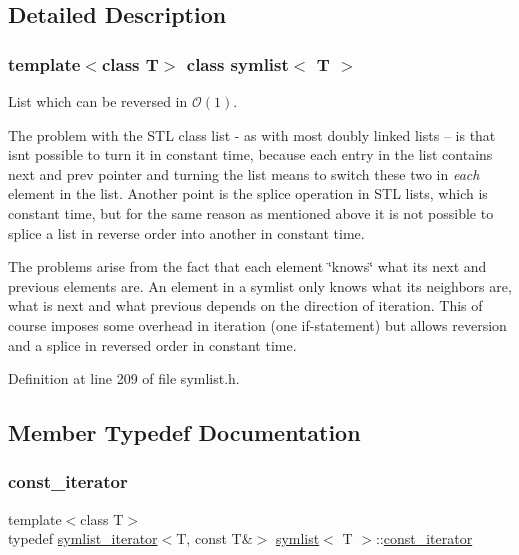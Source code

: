 \subsection{Detailed Description}
\subsubsection*{template$<$class T$>$\newline
class symlist$<$ T $>$}

List which can be reversed in $\mathcal{O}(1)$. 

The problem with the S\+TL class list -\/ as with most doubly linked lists -- is that isn\textquotesingle{}t possible to turn it in constant time, because each entry in the list contains next and prev pointer and turning the list means to switch these two in {\itshape each} element in the list. Another point is the splice operation in S\+TL lists, which is constant time, but for the same reason as mentioned above it is not possible to splice a list in reverse order into another in constant time. 

The problems arise from the fact that each element \char`\"{}knows\char`\"{} what its next and previous elements are. An element in a symlist only knows what its neighbors are, what is next and what previous depends on the direction of iteration. This of course imposes some overhead in iteration (one if-\/statement) but allows reversion and a splice in reversed order in constant time. 

Definition at line 209 of file symlist.\+h.



\subsection{Member Typedef Documentation}
\mbox{\label{classsymlist_af15c0ca931299054f83d17a1580a5159}} 
\subsubsection{\texorpdfstring{const\+\_\+iterator}{const\_iterator}}
{\footnotesize\ttfamily template$<$class T$>$ \\
typedef \mbox{\hyperlink{structsymlist__iterator}{symlist\+\_\+iterator}}$<$T, const T\&$>$ \mbox{\hyperlink{classsymlist}{symlist}}$<$ T $>$\+::\mbox{\hyperlink{classsymlist_af15c0ca931299054f83d17a1580a5159}{const\+\_\+iterator}}}



